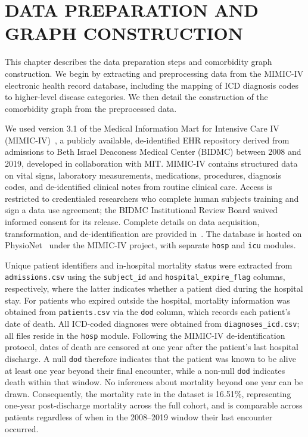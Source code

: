 \begingroup
\clearpage
\let\clearpage\relax
\vspace*{-16pt}
\chapter[DATA PREPARATION AND GRAPH CONSTRUCTION]{DATA PREPARATION AND GRAPH CONSTRUCTION}\label{sec.DATAPREP}
\endgroup

This chapter describes the data preparation steps and comorbidity
graph construction. We begin by extracting and preprocessing data from the
MIMIC-IV electronic health record database, including the mapping of
ICD diagnosis codes to higher-level disease categories. We then detail
the construction of the comorbidity graph from the preprocessed data.

We used version 3.1 of the Medical Information Mart for Intensive
Care IV (MIMIC-IV)~\citep{mimiciv}, a publicly available,
de-identified EHR repository derived from admissions to Beth Israel
Deaconess Medical Center (BIDMC) between 2008 and 2019, developed in
collaboration with MIT. MIMIC-IV contains structured data on vital
signs, laboratory measurements, medications, procedures, diagnosis
codes, and de-identified clinical notes from routine clinical care.
Access is restricted to credentialed researchers who complete human
subjects training and sign a data use agreement; the BIDMC
Institutional Review Board waived informed consent for its release.
Complete details on data acquisition, transformation, and
de-identification are provided in~\citep{mimiciv}. The database is
hosted on PhysioNet~\citep{physionet} under the MIMIC-IV project,
with separate \texttt{hosp} and \texttt{icu} modules.

Unique patient identifiers and in-hospital mortality status were
extracted from \texttt{admissions.csv} using the \texttt{subject\_id}
and \texttt{hospital\_expire\_flag} columns, respectively, where the
latter indicates whether a patient died during the hospital stay. For
patients who expired outside the hospital, mortality information was
obtained from \texttt{patients.csv} via the \texttt{dod} column,
which records each patient's date of death. All ICD-coded diagnoses
were obtained from \texttt{diagnoses\_icd.csv}; all files reside in
the \texttt{hosp} module. Following the MIMIC-IV de-identification
protocol, dates of death are censored at one year after the patient's
last hospital discharge. A null \texttt{dod} therefore indicates that
the patient was known to be alive at least one year beyond their final
encounter, while a non-null \texttt{dod} indicates death within that
window. No inferences about mortality beyond one year can be drawn.
Consequently, the mortality rate in the dataset is 16.51\%,
representing one-year post-discharge mortality across the full cohort,
and is comparable across patients regardless of when in the 2008--2019 window their last encounter occurred.


